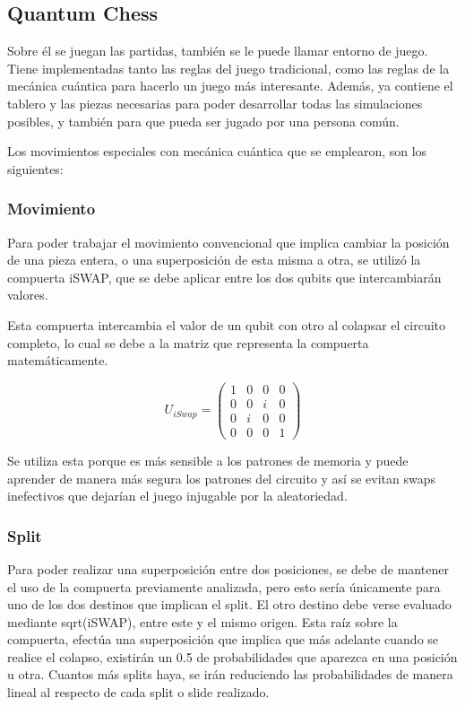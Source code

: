\subsection{Quantum Chess}

Sobre él se juegan las partidas, también se le puede llamar entorno de juego. Tiene implementadas tanto las reglas del juego tradicional, como las reglas de la mecánica cuántica para hacerlo un juego más interesante. Además, ya contiene el tablero y las piezas necesarias para poder desarrollar todas las simulaciones posibles, y también para que pueda ser jugado por una persona común.

Los movimientos especiales con mecánica cuántica que se emplearon, son los siguientes:

\subsubsection{Movimiento}

Para poder trabajar el movimiento convencional que implica cambiar la posición de una pieza entera, o una superposición de esta misma a otra, se utilizó la compuerta iSWAP, que se debe aplicar entre los dos qubits que intercambiarán valores.

Esta compuerta intercambia el valor de un qubit con otro al colapsar el circuito completo, lo cual se debe a la matriz que representa la compuerta matemáticamente.


\[
U_{iSwap} = \begin{pmatrix}
1 & 0 & 0 & 0 \\
0 & 0 & i & 0 \\
0 & i & 0 & 0 \\
0 & 0 & 0 & 1
\end{pmatrix}
\]

Se utiliza esta porque es más sensible a los patrones de memoria y puede aprender de manera más segura los patrones del circuito y así se evitan swaps inefectivos que dejarían el juego injugable por la aleatoriedad.

\subsubsection{Split} 

Para poder realizar una superposición entre dos posiciones, se debe de mantener el uso de la compuerta previamente analizada, pero esto sería únicamente para uno de los dos destinos que implican el split. El otro destino debe verse evaluado mediante sqrt(iSWAP), entre este y el mismo origen.\newline
Esta raíz sobre la compuerta, efectúa una superposición que implica que más adelante cuando se realice el colapso, existirán un 0.5 de probabilidades que aparezca en una posición u otra. Cuantos más splits haya, se irán reduciendo las probabilidades de manera lineal al respecto de cada split o slide realizado.

